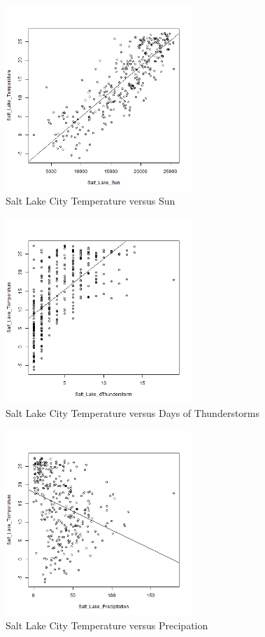\begin{figure}
  \centering
  \includegraphics[width=7cm]{../data/img/Temp_vs_sun.PNG}
  \caption{Salt Lake City Temperature versus Sun}
  \label{fig:temp_vs_sun}
\end{figure}

\begin{figure}
  \centering
  \includegraphics[width=7cm]{../data/img/Temp_vs_dThunderstorm.PNG}
  \caption{Salt Lake City Temperature versus Days of Thunderstorms}
  \label{fig:temp_vs_dthunderstorms}
\end{figure}

\begin{figure}
  \centering
  \includegraphics[width=7cm]{../data/img/Temp_vs_Precipitation.PNG}
  \caption{Salt Lake City Temperature versus Precipation}
  \label{fig:temp_vs_precipation}
\end{figure}

